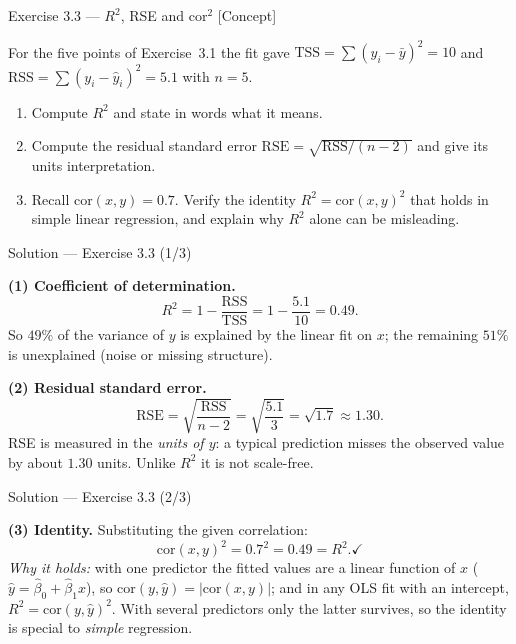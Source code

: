 \documentclass[aspectratio=169,11pt]{beamer}
\begin{document}
\begin{frame}{Exercise 3.3 --- $R^2$, RSE and $\mathrm{cor}^2$ [Concept]}
  \begin{exercise}
    For the five points of Exercise~3.1 the fit gave
    $\mathrm{TSS}=\sum(y_i-\bar y)^2 = 10$ and
    $\mathrm{RSS}=\sum(y_i-\hat y_i)^2 = 5.1$ with $n=5$.
    \begin{enumerate}
      \item Compute $R^2$ and state in words what it means.
      \item Compute the residual standard error
            $\mathrm{RSE}=\sqrt{\mathrm{RSS}/(n-2)}$ and give its units
            interpretation.
      \item Recall $\mathrm{cor}(x,y)=0.7$. Verify the identity
            $R^2=\mathrm{cor}(x,y)^2$ that holds in simple linear
            regression, and explain why $R^2$ alone can be misleading.
    \end{enumerate}
  \end{exercise}
\end{frame}

\begin{frame}{Solution --- Exercise 3.3 (1/3)}
  \begin{solutionbox}
    \textbf{(1) Coefficient of determination.}
    \[
      R^2 = 1-\frac{\mathrm{RSS}}{\mathrm{TSS}} = 1-\frac{5.1}{10}=0.49.
    \]
    So $49\%$ of the variance of $y$ is explained by the linear fit on
    $x$; the remaining $51\%$ is unexplained (noise or missing
    structure).

    \textbf{(2) Residual standard error.}
    \[
      \mathrm{RSE}=\sqrt{\frac{\mathrm{RSS}}{n-2}}
        =\sqrt{\frac{5.1}{3}}=\sqrt{1.7}\approx 1.30.
    \]
    RSE is measured in the \emph{units of $y$}: a typical prediction
    misses the observed value by about $1.30$ units. Unlike $R^2$ it is
    not scale-free.
  \end{solutionbox}
\end{frame}

\begin{frame}{Solution --- Exercise 3.3 (2/3)}
  \begin{solutionbox}
    \textbf{(3) Identity.} Substituting the given correlation:
    \[
      \mathrm{cor}(x,y)^2 = 0.7^2 = 0.49 = R^2. \checkmark
    \]
    \emph{Why it holds:} with one predictor the fitted values are a
    linear function of $x$ ($\hat y=\hat\beta_0+\hat\beta_1 x$), so
    $\mathrm{cor}(y,\hat y)=|\mathrm{cor}(x,y)|$; and in any OLS fit
    with an intercept, $R^2=\mathrm{cor}(y,\hat y)^2$. With several
    predictors only the latter survives, so the identity is special to
    \emph{simple} regression.
  \end{solutionbox}
\end{frame}
\end{document}
